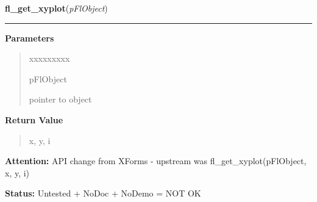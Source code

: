 \hspace{.8\funcindent}\begin{boxedminipage}{\funcwidth}

    \raggedright \textbf{fl\_get\_xyplot}(\textit{pFlObject})

    \vspace{-1.5ex}

    \rule{\textwidth}{0.5\fboxrule}
\setlength{\parskip}{2ex}
\setlength{\parskip}{1ex}
      \textbf{Parameters}
      \vspace{-1ex}

      \begin{quote}
        \begin{Ventry}{xxxxxxxxx}

          \item[pFlObject]

          pointer to object

        \end{Ventry}

      \end{quote}

      \textbf{Return Value}
    \vspace{-1ex}

      \begin{quote}
      x, y, i

      \end{quote}

\textbf{Attention:} API change from XForms - upstream was fl\_get\_xyplot(pFlObject, x, y, i)



\textbf{Status:} Untested + NoDoc + NoDemo = NOT OK



    \end{boxedminipage}

    \label{xformslib:flxyplot:fl_get_xyplot_data}

    \vspace{0.5ex}

